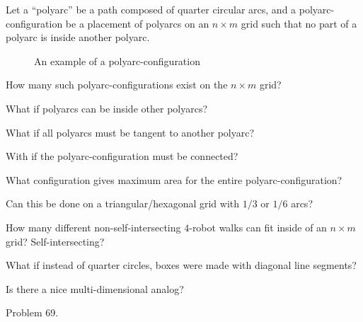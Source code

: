 \documentclass{article}
\begin{document}
Let a ``polyarc'' be a path composed of quarter circular arcs, and a polyarc-configuration be
a placement of polyarcs on an $n \times m$ grid such that no part of a polyarc is
inside another polyarc.
\begin{figure}[ht!]
  \centering
  \caption{
    An example of a polyarc-configuration
  }
\end{figure}
\begin{question}
  How many such polyarc-configurations exist on the $n \times m$ grid?
\end{question}

\begin{related}
  \item What if polyarcs can be inside other polyarcs?
  \item What if all polyarcs must be tangent to another polyarc?
  \item With if the polyarc-configuration must be connected?
  \item What configuration gives maximum area for the entire polyarc-configuration?
  \item Can this be done on a triangular/hexagonal grid with $1/3$ or $1/6$ arcs?
  \item How many different non-self-intersecting $4$-robot walks can fit inside
    of an $n \times m$ grid? Self-intersecting?
  \item What if instead of quarter circles, boxes were made with diagonal line
    segments?
  \item Is there a nice multi-dimensional analog?
\end{related}
\begin{references}
  \item Problem 69.
\end{references}
\end{document}
